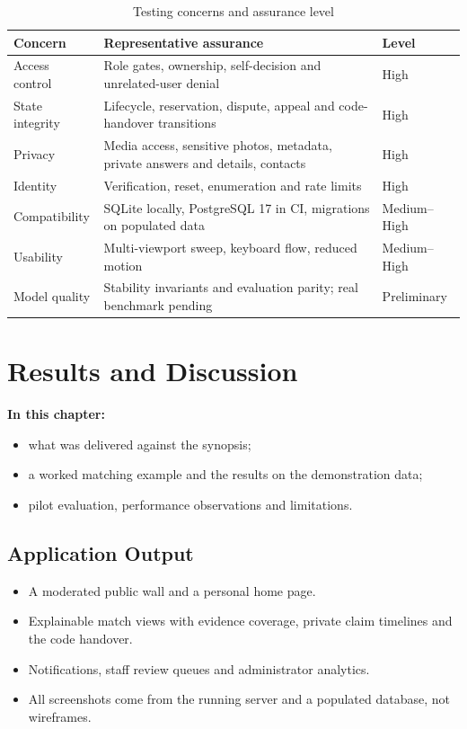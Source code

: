 \documentclass[12pt,a4paper,oneside]{report}
\begin{document}
\begin{table}[H]
\centering\small
\caption{Testing concerns and assurance level}
\begin{tabularx}{\textwidth}{P{30mm}X P{26mm}}
\toprule
Concern & Representative assurance & Level\\
\midrule
Access control & Role gates, ownership, self-decision and unrelated-user denial & High\\
State integrity & Lifecycle, reservation, dispute, appeal and code-handover transitions & High\\
Privacy & Media access, sensitive photos, metadata, private answers and details, contacts & High\\
Identity & Verification, reset, enumeration and rate limits & High\\
Compatibility & SQLite locally, PostgreSQL 17 in CI, migrations on populated data & Medium--High\\
Usability & Multi-viewport sweep, keyboard flow, reduced motion & Medium--High\\
Model quality & Stability invariants and evaluation parity; real benchmark pending & Preliminary\\
\bottomrule
\end{tabularx}
\end{table}

\chapter{Results and Discussion}
\textbf{In this chapter:}
\begin{itemize}[beginpenalty=10000]
  \item what was delivered against the synopsis;
  \item a worked matching example and the results on the demonstration data;
  \item pilot evaluation, performance observations and limitations.
\end{itemize}

\section{Application Output}
\begin{itemize}
  \item A moderated public wall and a personal home page.
  \item Explainable match views with evidence coverage, private claim timelines and the code handover.
  \item Notifications, staff review queues and administrator analytics.
  \item All screenshots come from the running server and a populated database, not wireframes.
\end{itemize}
\end{document}
